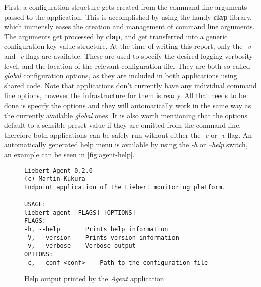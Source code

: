         First, a configuration structure gets created from the command line arguments passed to the application. This is accomplished by using the handy \textbf{clap} library, which immensly eases the creation and management of command line arguments. The arguments get processed by \textbf{clap}, and get transferred into a generic configuration key-value structure. At the time of writing this report, only the \textit{-v} and \textit{-c} flags are available. These are used to specify the desired logging verbosity level, and the location of the relevant configuration file. They are both so-called \textit{global} configuration options, as they are included in both applications using shared code. Note that applications don't currently have any individual command line options, however the infrastructure for them is ready. All that needs to be done is specify the options and they will automatically work in the same way as the currently available \textit{global} ones. It is also worth mentioning that the options default to a sensible preset value if they are omitted from the command line, therefore both applications can be safely run without either the \textit{-c} or \textit{-v} flag. An automatically generated help menu is available by using the \textit{-h} or \textit{--help} switch, an example can be seen in \autoref{fig:agent-help}.
        
        \begin{figure}[!htb]
            \centering
            \begin{BVerbatim}
Liebert Agent 0.2.0
(c) Martin Kukura
Endpoint application of the Liebert monitoring platform.

USAGE:
liebert-agent [FLAGS] [OPTIONS]
FLAGS:
-h, --help       Prints help information
-V, --version    Prints version information
-v, --verbose    Verbose output
OPTIONS:
-c, --conf <conf>    Path to the configuration file
            \end{BVerbatim}
            \caption{Help output printed by the \textit{Agent} application}
            \label{fig:agent-help}
        \end{figure}
        
